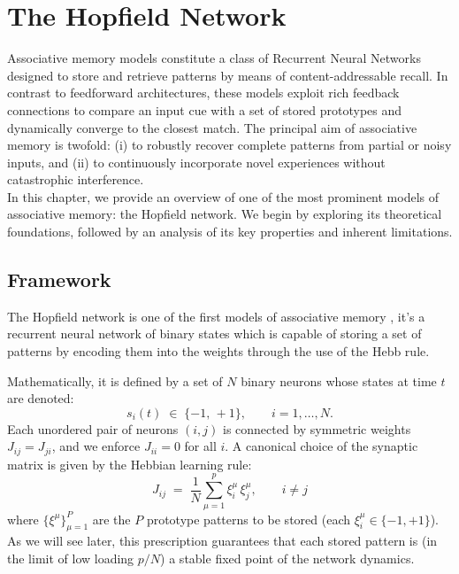 \documentclass[a4paper,12pt]{report}
\begin{document}




\chapter{The Hopfield Network}
Associative memory models constitute a class of Recurrent Neural Networks designed to 
store and retrieve patterns by means of content-addressable recall. In contrast to 
feedforward architectures, these models exploit rich feedback connections to compare an 
input cue with a set of stored prototypes and dynamically converge to the closest match. 
The principal aim of associative memory is twofold: (i) to robustly recover complete 
patterns from partial or noisy inputs, and (ii) to continuously incorporate novel 
experiences without catastrophic interference. \\
In this chapter, we provide an overview of one of the most prominent models 
of associative memory: the Hopfield network. We begin by exploring its theoretical 
foundations, followed by an analysis of its key properties and inherent limitations.

\section{Framework}
The Hopfield network is one of the first models of associative memory \cite{Hopfield1982, Hopfield1984}, it's a recurrent neural network of binary states which is capable of
storing a set of patterns by encoding them into the weights through the use of the Hebb 
rule.
\vspace*{0.5em}

Mathematically, it is defined by a set of \(N\) binary neurons whose states at time 
\(t\) are denoted:
\[
s_i(t) \;\in\; \{ -1,\,+1\}, 
\qquad i = 1, \dots, N.
\]
Each unordered pair of neurons \((i,j)\) is connected by symmetric weights 
\(J_{ij} = J_{ji}\), and we enforce \(J_{ii}=0\) for all \(i\).  A canonical choice of 
the synaptic matrix is given by the Hebbian learning rule:
\begin{equation}
J_{ij}
\;=\;
\frac{1}{N} \sum_{\mu=1}^{p} \xi_i^{\mu}\,\xi_j^{\mu}, \qquad i \neq j
\end{equation}
where \(\{\xi^{\mu}\}_{\mu=1}^P\) are the \(P\) prototype patterns to be stored (each 
\(\xi_i^\mu\in\{-1,+1\}\)). As we will see later, this prescription guarantees that each 
stored pattern is (in the limit of low loading \(p/N\)) a stable fixed point of the 
network dynamics.
\end{document}
